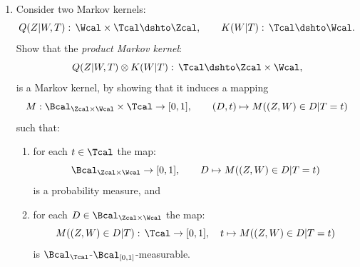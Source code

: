 \begin{enumerate}[label=3.\arabic*]
    \item Consider two Markov kernels:
    \begin{equation*}
        Q(Z|W,T):\, \Wcal\times \Tcal \dshto \Zcal,\qquad
        K(W|T):\, \Tcal \dshto \Wcal.
    \end{equation*}
    Show that the \emph{product Markov kernel}:
    \begin{equation*}
        Q(Z|W,T) \otimes K(W|T) :\, \Tcal \dshto \Zcal \times \Wcal,
    \end{equation*}
    is a Markov kernel, by showing that it induces a mapping
    \begin{equation*}
        M: \Bcal_{\Zcal \times \Wcal}\times \Tcal \to [0,1], \qquad (D, t) \mapsto M((Z, W)\in D|T=t)
    \end{equation*}
    such that:
    \begin{enumerate}[label=\roman*)]
        \item for each $t \in \Tcal$ the map:
        \[ \Bcal_{\Zcal \times \Wcal} \to [0,1],\qquad D \mapsto M((Z,W)\in D|T=t)\]
        is a probability measure, and
        \item for each $D \in \Bcal_{\Zcal \times \Wcal}$ the map:
        \[ M((Z,W) \in D|T):\, \Tcal \to [0,1],\quad t \mapsto M((Z, W) \in D|T=t) \]
        is $\Bcal_\Tcal$-$\Bcal_{[0,1]}$-measurable.
    \end{enumerate}



\end{enumerate}


